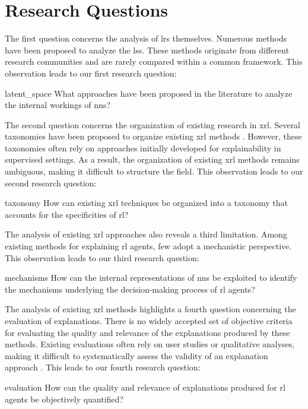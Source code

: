 \section{Research Questions}
\label{sec:introduction_research_questions}

The first question concerns the analysis of \glspl{lr} themselves.
Numerous methods have been proposed to analyze the \glspl{ls}.
These methods originate from different research communities and are rarely compared within a common framework.
This observation leads to our first research question:

\begin{researchquestion}{}{latent_space}
What approaches have been proposed in the literature to analyze the internal workings of \glspl{nn}?
\end{researchquestion}

The second question concerns the organization of existing research in \gls{xrl}.
Several taxonomies have been proposed to organize existing \gls{xrl} methods \parencite{puiutta2020explainable, milani2022explainable}.
However, these taxonomies often rely on approaches initially developed for explainability in supervised settings.
As a result, the organization of existing \gls{xrl} methods remains ambiguous, making it difficult to structure the field.
This observation leads to our second research question:

\begin{researchquestion}{}{taxonomy}
How can existing \gls{xrl} techniques be organized into a taxonomy that accounts for the specificities of \gls{rl}?
\end{researchquestion}

The analysis of existing \gls{xrl} approaches also reveals a third limitation.
Among existing methods for explaining \gls{rl} agents, few adopt a mechanistic perspective.
This observation leads to our third research question:

\begin{researchquestion}{}{mechanisms}
How can the internal representations of \glspl{nn} be exploited to identify the mechanisms underlying the decision-making process of \gls{rl} agents?
\end{researchquestion}

The analysis of existing \gls{xrl} methods highlights a fourth question concerning the evaluation of explanations.
There is no widely accepted set of objective criteria for evaluating the quality and relevance of the explanations produced by these methods.
Existing evaluations often rely on user studies or qualitative analyses, making it difficult to systematically assess the validity of an explanation approach \parencite{doshivelez2017rigorous, milani2022explainable}.
This leads to our fourth research question:

\begin{researchquestion}{}{evaluation}
How can the quality and relevance of explanations produced for \gls{rl} agents be objectively quantified?
\end{researchquestion}
